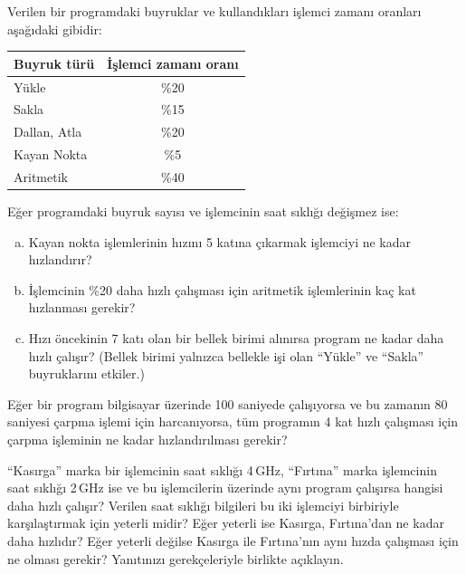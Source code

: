 \begin{alistirma}[\orta]
Verilen bir programdaki buyruklar ve kullandıkları işlemci zamanı oranları aşağıdaki gibidir:

\begin{center}
\small
\begin{tabular}{lc}
\toprule
\textbf{Buyruk türü} & \textbf{İşlemci zamanı oranı} \\
\midrule
Yükle        & \%20 \\
Sakla        & \%15 \\
Dallan, Atla & \%20 \\
Kayan Nokta  & \%5  \\
Aritmetik    & \%40 \\
\bottomrule
\end{tabular}
\end{center}

Eğer programdaki buyruk sayısı ve işlemcinin saat sıklığı değişmez ise:
\begin{enumerate}[(a)]
    \item Kayan nokta işlemlerinin hızını 5 katına çıkarmak işlemciyi ne kadar hızlandırır?
    \item İşlemcinin \%20 daha hızlı çalışması için aritmetik işlemlerinin kaç kat hızlanması gerekir?
    \item Hızı öncekinin 7 katı olan bir bellek birimi alınırsa program ne kadar daha hızlı çalışır? (Bellek birimi yalnızca bellekle işi olan ``Yükle'' ve ``Sakla'' buyruklarını etkiler.)
\end{enumerate}
\end{alistirma}

\begin{alistirma}[\kolay]
Eğer bir program bilgisayar üzerinde 100 saniyede çalışıyorsa ve bu zamanın 80 saniyesi çarpma işlemi için harcanıyorsa, tüm programın 4 kat hızlı çalışması için çarpma işleminin ne kadar hızlandırılması gerekir?
\end{alistirma}

\begin{alistirma}[\kolay]
``Kasırga'' marka bir işlemcinin saat sıklığı 4\,GHz, ``Fırtına'' marka işlemcinin saat sıklığı 2\,GHz ise ve bu işlemcilerin üzerinde aynı program çalışırsa hangisi daha hızlı çalışır? Verilen saat sıklığı bilgileri bu iki işlemciyi birbiriyle karşılaştırmak için yeterli midir? Eğer yeterli ise Kasırga, Fırtına'dan ne kadar daha hızlıdır? Eğer yeterli değilse Kasırga ile Fırtına'nın aynı hızda çalışması için ne olması gerekir? Yanıtınızı gerekçeleriyle birlikte açıklayın.
\end{alistirma}

